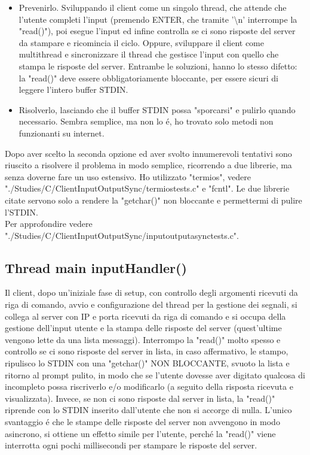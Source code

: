 \begin{itemize}
	\item Prevenirlo. Sviluppando il client come un singolo thread, che attende che l'utente completi l'input (premendo ENTER, che tramite '\textbackslash n' interrompe la "read()"), poi esegue l'input ed infine controlla se ci sono risposte del server da stampare e ricomincia il ciclo. Oppure, sviluppare il client come multithread e sincronizzare il thread che gestisce l'input con quello che stampa le risposte del server. Entrambe le soluzioni, hanno lo stesso difetto: la "read()" deve essere obbligatoriamente bloccante, per essere sicuri di leggere l'intero buffer STDIN.
	\item Risolverlo, lasciando che il buffer STDIN possa "sporcarsi" e pulirlo quando necessario. Sembra semplice, ma non lo \'e, ho trovato solo metodi non funzionanti su internet. 
\end{itemize}
\leavevmode
Dopo aver scelto la seconda opzione ed aver svolto innumerevoli tentativi sono riuscito a risolvere il problema in modo semplice, ricorrendo a due librerie, ma senza doverne fare un uso estensivo. Ho utilizzato "termios", vedere "./Studies/C/ClientInputOutputSync/termiostests.c" e "fcntl". Le due librerie citate servono solo a rendere la "getchar()" non bloccante e permettermi di pulire l'STDIN. 
\\
Per approfondire vedere "./Studies/C/ClientInputOutputSync/inputoutputasynctests.c".

 \subsection{Thread main inputHandler()}
 Il client, dopo un'iniziale fase di setup, con controllo degli argomenti ricevuti da riga di comando, avvio e configurazione del thread per la gestione dei segnali, si collega al server con IP e porta ricevuti da riga di comando e si occupa della gestione dell'input utente e la stampa delle risposte del server (quest'ultime vengono lette da una lista messaggi). Interrompo la "read()" molto spesso e controllo se ci sono risposte del server in lista, in caso affermativo, le stampo, ripulisco lo STDIN con una "getchar()" NON BLOCCANTE, svuoto la lista e ritorno al prompt pulito, in modo che se l'utente dovesse aver digitato qualcosa di incompleto possa riscriverlo e/o modificarlo (a seguito della risposta ricevuta e visualizzata). Invece, se non ci sono risposte dal server in lista, la "read()" riprende con lo STDIN inserito dall'utente che non si accorge di nulla. L'unico svantaggio \'e che le stampe delle risposte del server non avvengono in modo asincrono, si ottiene un effetto simile per l'utente, perch\'e la "read()" viene interrotta ogni pochi millisecondi per stampare le risposte del server. 

